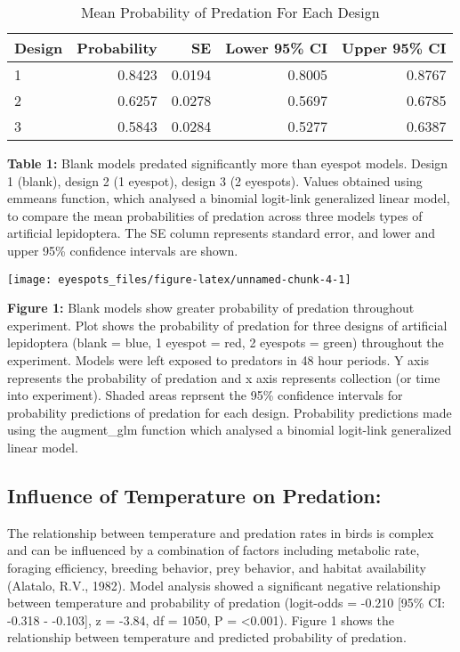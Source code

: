 \documentclass[
]{article}
\begin{document}
\begin{table}[H]
\centering
\caption{\label{tab:unnamed-chunk-2}Mean Probability of Predation For Each Design}
\fontsize{12}{14}\selectfont
\begin{tabular}[t]{lrrrr}
\toprule
Design & Probability & SE & Lower 95\% CI & Upper 95\% CI\\
\midrule
1 & 0.8423 & 0.0194 & 0.8005 & 0.8767\\
2 & 0.6257 & 0.0278 & 0.5697 & 0.6785\\
3 & 0.5843 & 0.0284 & 0.5277 & 0.6387\\
\bottomrule
\end{tabular}
\end{table}

\textbf{Table 1:} Blank models predated significantly more than eyespot
models. Design 1 (blank), design 2 (1 eyespot), design 3 (2 eyespots).
Values obtained using emmeans function, which analysed a binomial
logit-link generalized linear model, to compare the mean probabilities
of predation across three models types of artificial lepidoptera. The SE
column represents standard error, and lower and upper 95\% confidence
intervals are shown.

\begin{center}\texttt{[image: eyespots\_files/figure-latex/unnamed-chunk-4-1]} \end{center}

\textbf{Figure 1:} Blank models show greater probability of predation
throughout experiment. Plot shows the probability of predation for three
designs of artificial lepidoptera (blank = blue, 1 eyespot = red, 2
eyespots = green) throughout the experiment. Models were left exposed to
predators in 48 hour periods. Y axis represents the probability of
predation and x axis represents collection (or time into experiment).
Shaded areas reprsent the 95\% confidence intervals for probability
predictions of predation for each design. Probability predictions made
using the augment\_glm function which analysed a binomial logit-link
generalized linear model.

\hypertarget{influence-of-temperature-on-predation}{%
\subsection{Influence of Temperature on
Predation:}\label{influence-of-temperature-on-predation}}

The relationship between temperature and predation rates in birds is
complex and can be influenced by a combination of factors including
metabolic rate, foraging efficiency, breeding behavior, prey behavior,
and habitat availability (Alatalo, R.V., 1982). Model analysis showed a
significant negative relationship between temperature and probability of
predation (logit-odds = -0.210 {[}95\% CI: -0.318 - -0.103{]}, z =
-3.84, df = 1050, P = \textless0.001). Figure 1 shows the relationship
between temperature and predicted probability of predation.
\end{document}
